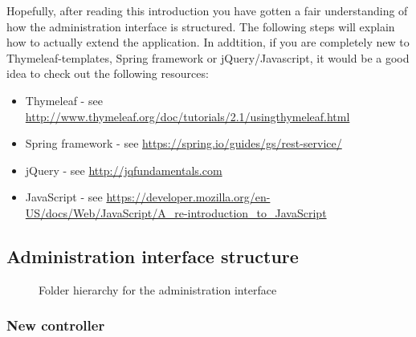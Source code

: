 Hopefully, after reading this introduction you have gotten a fair understanding of how the administration interface is structured. The following steps will explain how to actually extend the application. In addtition, if you are completely new to Thymeleaf-templates, Spring framework or jQuery/Javascript, it would be a good idea to check out the following resources: 

\begin{itemize}
\setlength{\itemsep}{0cm}%
\item Thymeleaf - see \url{http://www.thymeleaf.org/doc/tutorials/2.1/usingthymeleaf.html}
\item Spring framework - see \url{https://spring.io/guides/gs/rest-service/}
\item jQuery - see \url{http://jqfundamentals.com}
\item JavaScript - see \url{https://developer.mozilla.org/en-US/docs/Web/JavaScript/A_re-introduction_to_JavaScript}
\end{itemize}

\subsection{Administration interface structure}

\begin{center}
  \begin{figure}[ht!]
    \caption{Folder hierarchy for the administration interface}
    \label{fig:oac-folder-hierarchy}
  \end{figure}
\end{center}

\subsubsection{New controller}

